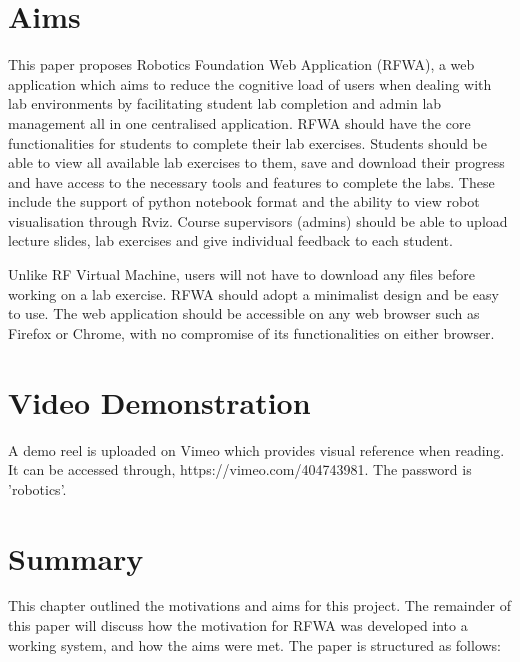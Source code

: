 \documentclass{l4proj}
\begin{document}
\section{Aims}

This paper proposes Robotics Foundation Web Application (RFWA), a web application which aims to reduce the cognitive load of users when dealing with lab environments by facilitating student lab completion and admin lab management all in one centralised application. RFWA should have the core functionalities for students to complete their lab exercises. Students should be able to view all available lab exercises to them, save and download their progress and have access to the necessary tools and features to complete the labs. These include the support of python notebook format and the ability to view robot visualisation through Rviz. Course supervisors (admins) should be able to upload lecture slides, lab exercises and give individual feedback to each student.

Unlike RF Virtual Machine, users will not have to download any files before working on a lab exercise.
RFWA should adopt a minimalist design and be easy to use. The web application should be accessible on any web browser such as Firefox or Chrome, with no compromise of its functionalities on either browser.

\section{Video Demonstration}
 
A demo reel is uploaded on Vimeo which provides visual reference when reading. It can be accessed through, https://vimeo.com/404743981. The password is 'robotics'.

\section{Summary}
This chapter outlined the motivations and aims for this project. The remainder of this paper will discuss how the motivation for RFWA was developed into a working system, and how the aims were met. The paper is structured as follows:
\end{document}
